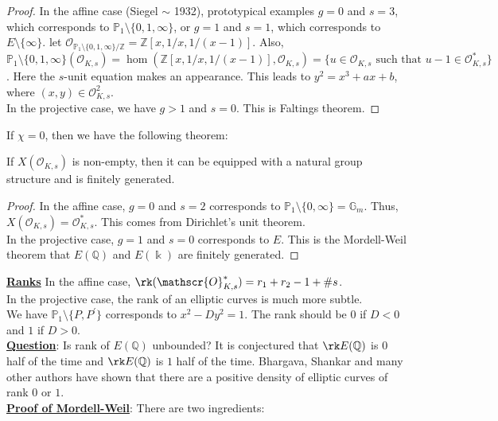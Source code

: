 \begin{proof}
In the affine case (Siegel $\sim$ 1932), prototypical examples $g=0$ and $s=3$, which corresponds to $\mathbb{P}_{1} \setminus \{0,1,\infty\}$, or $g=1$ and $s=1$, which corresponds to $E \setminus \{\infty\}$.  let $\mathscr{O}_{\mathbb{P}_{1} \setminus \{0,1,\infty\}/\mathbb{Z}} = \mathbb{Z}[x,1/x,1/(x-1)]$.  Also, $\mathbb{P}_{1} \setminus \{0,1,\infty\}(\mathscr{O}_{K,s})=\hom(\mathbb{Z}[x,1/x,1/(x-1)],\mathscr{O}_{K,s})=\{u \in \mathscr{O}_{K,s} \text{ such that } u-1 \in \mathscr{O}_{K,s}^{\ast}\}$.  Here the $s$-unit equation makes an appearance.  This leads to $y^{2}=x^{3}+ax+b$, where $(x,y) \in \mathscr{O}_{K,s}^{2}$.\\
\indent In the projective case, we have $g > 1$ and $s=0$.  This is Faltings theorem.
\end{proof}
\indent If $\chi=0$, then we have the following theorem:
\begin{theorem}
If $X(\mathscr{O}_{K,s})$ is non-empty, then it can be equipped with a natural group structure and is finitely generated.
\end{theorem}
\begin{proof}
In the affine case, $g=0$ and $s=2$ corresponds to $\mathbb{P}_{1} \setminus \{0,\infty\}=\mathbb{G}_{m}$.  Thus, $X(\mathscr{O}_{K,s})=\mathscr{O}_{K,s}^{\ast}$.  This comes from Dirichlet's unit theorem.\\
\indent In the projective case, $g=1$ and $s=0$ corresponds to $E$.  This is the Mordell-Weil theorem that $E(\mathbb{Q})$ and $E(\Bbbk)$ are finitely generated.
\end{proof}
\indent \underline{\textbf{Ranks}}  In the affine case, $\rk(\mathscr{O}_{K,s}^{\ast})=r_{1}+r_{2}-1+\#s$.\\
\indent In the projective case, the rank of an elliptic curves is much more subtle.\\
\indent We have $\mathbb{P}_{1} \setminus \{P,P^{\prime}\}$ corresponds to $x^{2}-Dy^{2}=1$.  The rank should be $0$ if $D < 0$ and $1$ if $D > 0$.\\
\indent \underline{\textbf{Question}}:  Is rank of $E(\mathbb{Q})$ unbounded?  It is conjectured that $\rk E(\mathbb{Q})$ is $0$ half of the time and $\rk E(\mathbb{Q})$ is $1$ half of the time.  Bhargava, Shankar and many other authors have shown that there are a positive density of elliptic curves of rank $0$ or $1$.\\
\indent \underline{\textbf{Proof of Mordell-Weil}}:  There are two ingredients:
